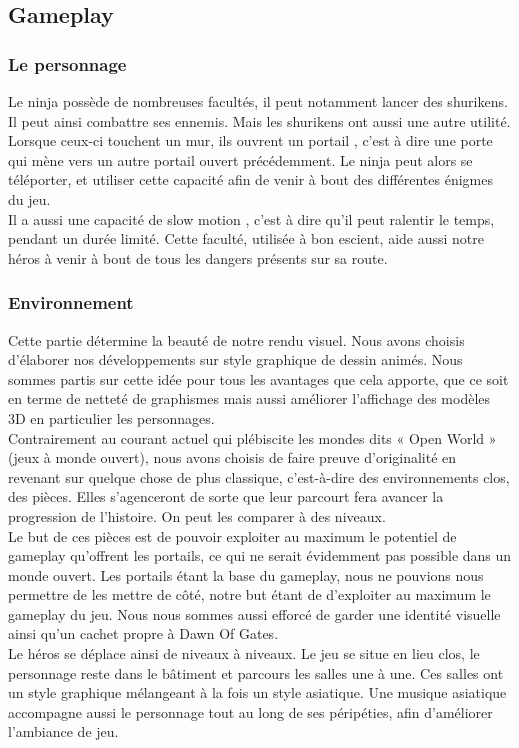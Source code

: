 \documentclass[12pt]{article}
\begin{document}
\subsection{Gameplay}

\subsubsection{Le personnage}

Le ninja possède de nombreuses facultés, il peut notamment lancer des shurikens. Il peut ainsi combattre ses ennemis. Mais les shurikens ont aussi une autre utilité. Lorsque ceux-ci touchent un mur, ils ouvrent un \og portail \fg{}, c'est à dire une porte qui mène vers un autre portail ouvert précédemment. Le ninja peut alors se téléporter, et utiliser cette capacité afin de venir à bout des différentes énigmes du jeu.\\
Il a aussi une capacité de \og slow motion \fg{}, c'est à dire qu'il peut ralentir le temps, pendant un durée limité. Cette faculté, utilisée à bon escient, aide aussi notre héros à venir à bout de tous les dangers présents sur sa route.\\

\subsubsection{Environnement}

Cette partie détermine la beauté de notre rendu visuel. Nous avons choisis d'élaborer nos développements sur style graphique de dessin animés. Nous sommes partis sur cette idée pour tous les avantages que cela apporte, que ce soit en terme de netteté de graphismes mais aussi améliorer l'affichage des modèles 3D en particulier les personnages.\\
Contrairement au courant actuel qui plébiscite les mondes dits « Open World » (jeux à monde ouvert), nous avons choisis de faire preuve d'originalité en revenant sur quelque chose de plus classique, c'est-à-dire des environnements clos, des pièces. Elles s'agenceront de sorte que leur parcourt fera avancer la progression de l'histoire. On peut les comparer à des niveaux.\\
Le but de ces pièces est de pouvoir exploiter au maximum le potentiel de gameplay qu'offrent les portails, ce qui ne serait évidemment pas possible dans un monde ouvert. Les portails étant la base du gameplay, nous ne pouvions nous permettre de les mettre de côté, notre but étant de d'exploiter au maximum le gameplay du jeu. Nous nous sommes aussi efforcé de garder une identité visuelle ainsi qu'un cachet propre à Dawn Of Gates.\\
Le héros se déplace ainsi de niveaux à niveaux. Le jeu se situe en lieu clos, le personnage reste dans le bâtiment et parcours les salles une à une. Ces salles ont un style graphique mélangeant à la fois un style asiatique. Une musique asiatique accompagne aussi le personnage tout au long de ses péripéties, afin d'améliorer l'ambiance de jeu.
\end{document}
